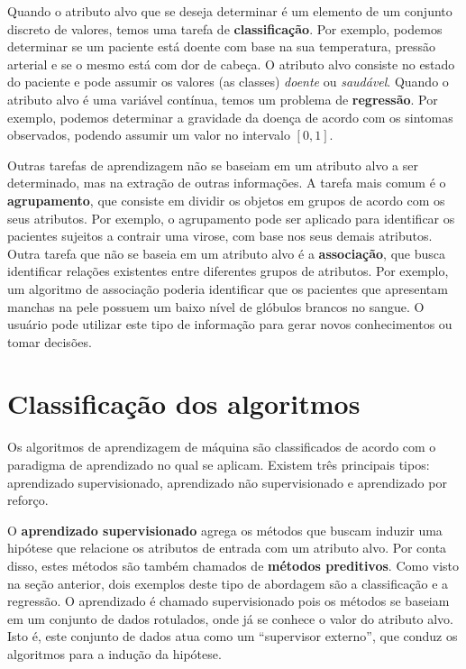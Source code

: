 Quando o atributo alvo que se deseja determinar é um elemento de um conjunto discreto de valores, temos uma tarefa de \textbf{classificação}. Por exemplo, podemos determinar se um paciente está doente com base na sua temperatura, pressão arterial e se o mesmo está com dor de cabeça. O atributo alvo consiste no estado do paciente e pode assumir os valores (as classes) \textit{doente} ou \textit{saudável}. Quando o atributo alvo é uma variável contínua, temos um problema de \textbf{regressão}. Por exemplo, podemos determinar a gravidade da doença de acordo com os sintomas observados, podendo assumir um valor no intervalo $[0, 1]$.

Outras tarefas de aprendizagem não se baseiam em um atributo alvo a ser determinado, mas na extração de outras informações. A tarefa mais comum é o \textbf{agrupamento}, que consiste em dividir os objetos em grupos de acordo com os seus atributos. Por exemplo, o agrupamento pode ser aplicado para identificar os pacientes sujeitos a contrair uma virose, com base nos seus demais atributos. Outra tarefa que não se baseia em um atributo alvo é a \textbf{associação}, que busca identificar relações existentes entre diferentes grupos de atributos. Por exemplo, um algoritmo de associação poderia identificar que os pacientes que apresentam manchas na pele possuem um baixo nível de glóbulos brancos no sangue. O usuário pode utilizar este tipo de informação para gerar novos conhecimentos ou tomar decisões.

\section{Classificação dos algoritmos}

Os algoritmos de aprendizagem de máquina são classificados de acordo com o paradigma de aprendizado no qual se aplicam. Existem três principais tipos: aprendizado supervisionado, aprendizado não supervisionado e aprendizado por reforço.

O \textbf{aprendizado supervisionado} agrega os métodos que buscam induzir uma hipótese que relacione os atributos de entrada com um atributo alvo. Por conta disso, estes métodos são também chamados de \textbf{métodos preditivos}. Como visto na seção anterior, dois exemplos deste tipo de abordagem são a classificação e a regressão. O aprendizado é chamado supervisionado pois os métodos se baseiam em um conjunto de dados rotulados, onde já se conhece o valor do atributo alvo. Isto é, este conjunto de dados atua como um ``supervisor externo'', que conduz os algoritmos para a indução da hipótese.

